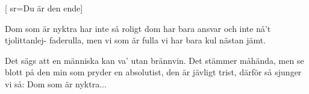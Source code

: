[ 						
	sr={Du är den ende}]		
	
\beginverse*						
Dom som är nyktra 
har inte så roligt
dom har bara ansvar 
och inte nå't tjolittanlej- faderulla, 
men vi som är fulla 
vi har bara kul nästan jämt. 
\endverse					

\beginverse				
Det sägs att en människa 
kan va' utan brännvin. 
Det stämmer måhända,
men se blott på den min
som pryder en absolutist,
den är jävligt trist, 
därför så sjunger vi så: 
Dom som är nyktra...
\endverse		
\endsong		
